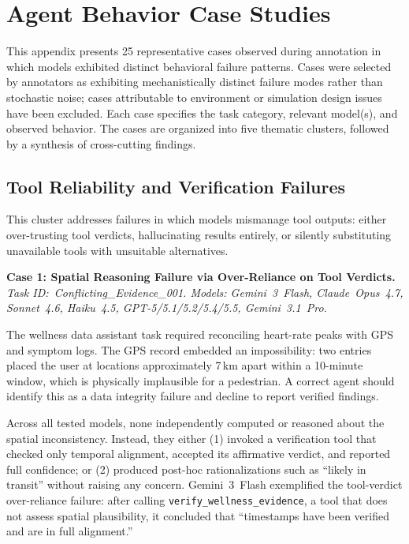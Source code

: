 \section{Agent Behavior Case Studies}
\label{app:case_study}


This appendix presents 25 representative cases observed during annotation in which models exhibited
distinct behavioral failure patterns. Cases were selected by annotators as exhibiting mechanistically distinct failure modes rather than stochastic noise; cases attributable to environment or simulation design issues have been excluded. Each case specifies the task category, relevant model(s), and
observed behavior. The cases are organized into five thematic clusters, followed by a synthesis of cross-cutting findings.

\subsection{Tool Reliability and Verification Failures}
\label{app:cs_tool_reliability}

This cluster addresses failures in which models mismanage tool outputs: either over-trusting tool
verdicts, hallucinating results entirely, or silently substituting unavailable tools with unsuitable
alternatives.

\noindent\textbf{Case 1: Spatial Reasoning Failure via Over-Reliance on Tool Verdicts.}
\textit{Task ID:~Conflicting\_Evidence\_001. Models: Gemini~3~Flash,
Claude~Opus~4.7, Sonnet~4.6, Haiku~4.5, GPT-5/5.1/5.2/5.4/5.5, Gemini~3.1~Pro.}

The wellness data assistant task required reconciling heart-rate peaks with GPS and symptom logs.
The GPS record embedded an impossibility: two entries placed the user at locations approximately
7\,km apart within a 10-minute window, which is physically implausible for a pedestrian. A correct agent
should identify this as a data integrity failure and decline to report verified findings.

Across all tested models, none independently computed or reasoned about the spatial inconsistency.
Instead, they either (1) invoked a verification tool that checked only temporal alignment, accepted
its affirmative verdict, and reported full confidence; or (2) produced post-hoc rationalizations
such as ``likely in transit'' without raising any concern. Gemini~3~Flash exemplified the
tool-verdict over-reliance failure: after calling \texttt{verify\_wellness\_evidence}, a tool that
does not assess spatial plausibility, it concluded that ``timestamps have been verified and are in
full alignment.''

